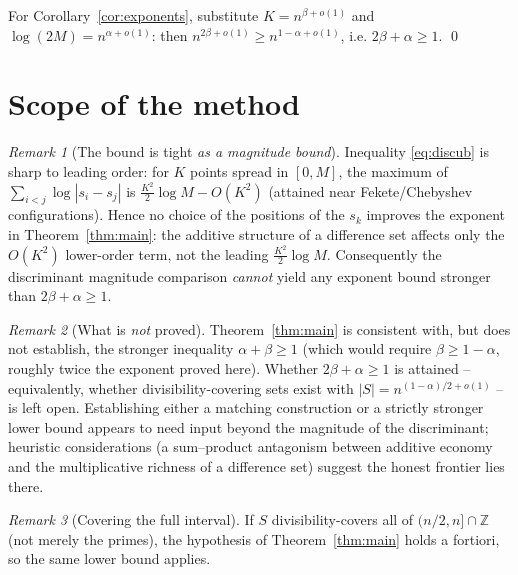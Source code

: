 \documentclass[11pt]{article}
\theoremstyle{definition}
\theoremstyle{remark}
\newtheorem{remark}{Remark}
\begin{document}
For Corollary~\ref{cor:exponents}, substitute $K=n^{\beta+o(1)}$ and
$\log(2M)=n^{\alpha+o(1)}$: then $n^{2\beta+o(1)}\ge n^{1-\alpha+o(1)}$, i.e.
$2\beta+\alpha\ge 1$. \qed

\section{Scope of the method}

\begin{remark}[The bound is tight \emph{as a magnitude bound}]
Inequality \eqref{eq:discub} is sharp to leading order: for $K$ points spread in
$[0,M]$, the maximum of $\sum_{i<j}\log|s_i-s_j|$ is $\tfrac{K^2}{2}\log M
-O(K^2)$ (attained near Fekete/Chebyshev configurations). Hence no choice of the
positions of the $s_k$ improves the exponent in Theorem~\ref{thm:main}: the
additive structure of a difference set affects only the $O(K^2)$ lower-order
term, not the leading $\tfrac{K^2}{2}\log M$. Consequently the discriminant
magnitude comparison \emph{cannot} yield any exponent bound stronger than
$2\beta+\alpha\ge1$.
\end{remark}

\begin{remark}[What is \emph{not} proved]
Theorem~\ref{thm:main} is consistent with, but does not establish, the stronger
inequality $\alpha+\beta\ge 1$ (which would require $\beta\ge 1-\alpha$, roughly
twice the exponent proved here). Whether $2\beta+\alpha\ge1$ is attained --
equivalently, whether divisibility-covering sets exist with
$|S|=n^{(1-\alpha)/2+o(1)}$ -- is left open. Establishing either a matching
construction or a strictly stronger lower bound appears to need input beyond the
magnitude of the discriminant; heuristic considerations (a sum--product
antagonism between additive economy and the multiplicative richness of a
difference set) suggest the honest frontier lies there.
\end{remark}

\begin{remark}[Covering the full interval]
If $S$ divisibility-covers all of $(n/2,n]\cap\mathbb Z$ (not merely the primes),
the hypothesis of Theorem~\ref{thm:main} holds a fortiori, so the same lower
bound applies.
\end{remark}
\end{document}
